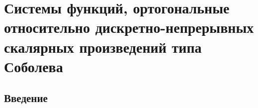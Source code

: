  \chapter{Системы функций, ортогональные относительно дискретно-непрерывных скалярных произведений типа Соболева}



\section*{Введение}




